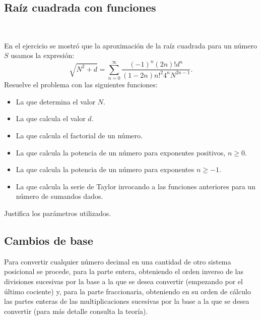 \separacion
\subsection{Raíz cuadrada con funciones} 

\

En el ejercicio {\sf {} } se mostró que la aproximación de la  raíz cuadrada para un número $S$ usamos la expresión:
 $${\displaystyle {\sqrt {N^{2}+d}}=\sum _{n=0}^{\infty }{\frac {(-1)^{n}(2n)!d^{n}}{(1-2n)n!^{2}4^{n}N^{2n-1}}}}.$$
Resuelve el problema con las siguientes funciones:
\begin{itemize}
\item La que determina el valor $N$.
\item La que calcula el valor $d$.
\item La que calcula el factorial de un número.
\item La que calcula la potencia de un número para exponentes positivos, $n\geq 0$.
\item La que calcula la potencia de un número para exponentes $n\geq -1$.
\item La que calcula la serie de Taylor invocando a las funciones anteriores para un número de sumandos dados.
\end{itemize}

Justifica los parámetros utilizados.







\separacion
\subsection{Cambios de base}


Para convertir cualquier número decimal en una cantidad de otro sistema posicional se procede, para la parte entera, obteniendo el orden inverso de las divisiones sucesivas por la base a la que se desea convertir (empezando por el último cociente) y, para la parte fraccionaria, obteniendo en su orden de cálculo las partes enteras de las multiplicaciones sucesivas por la base a la que se desea convertir (para más detalle consulta la teoría).

